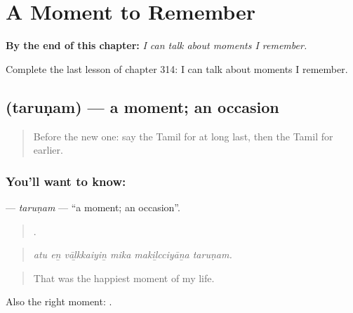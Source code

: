 
\chapter{A Moment to Remember}
\label{ch:ta-a-moment-to-remember}

\begin{chapteropening}
\textbf{By the end of this chapter:} \emph{I can talk about moments I remember.}

Complete the last lesson of chapter 314: I can talk about moments I remember.
\end{chapteropening}

\section[\texorpdfstring{\ta{தருணம்} (taruṇam)}{தருணம் (taruṇam)}]{ (taruṇam) — a moment; an occasion}

\label{lesson:TA-C314-tarunam}



\begin{quote}
Before the new one: say the Tamil for at long last, then the Tamil for earlier.
\end{quote}

\subsection*{You'll want to know: }
\textbf{} — \emph{taruṇam} — \textquotedblleft{}a moment; an occasion\textquotedblright{}.

\begin{quote}
     .
\end{quote}

\begin{quote}
\emph{atu eṉ vāḻkkaiyiṉ mika makiḻcciyāṉa taruṇam.}
\end{quote}

\begin{quote}
That was the happiest moment of my life.
\end{quote}

Also the right moment:  .

